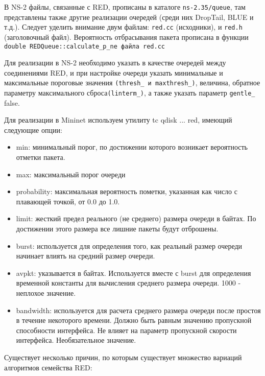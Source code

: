 В NS-2 файлы, связанные с RED, прописаны в каталоге
\verb|ns-2.35/queue|, там представлены также другие реализации
очередей (среди них DropTail, BLUE и т.д.). Следует уделить внимание
двум файлам: \verb|red.cc| (исходники), и \verb|red.h| (заголовочный
файл). Вероятность отбрасывания пакета прописана в функции 
\verb|double REDQueue::calculate_p_ne файла red.cc|

Для реализации в NS-2 необходимо указать в качестве очередей между соединениями
RED, и при настройке очереди указать минимальные и максимальные пороговые значения 
\verb|(thresh_ и maxthresh_)|, величина, обратное параметру максимального сброса\verb|(linterm_)|, 
а также указать параметр \verb|gentle_| false.

Для реализации в Mininet используем утилиту tc qdisk ... red, имеющий следующие опции:
\begin{itemize}
\item min: минимальный порог, по достижении которого возникает вероятность отметки пакета.
\item max: максимальный порог очереди
\item probability: максимальная вероятность пометки, указанная как число с плавающей точкой, от 0.0 до 1.0. 
\item limit: жесткий предел реального (не среднего) размера очереди в байтах. По достижении этого размера все лишние пакеты будут отброшены.
\item burst: используется для определения того, как реальный размер очереди начинает влиять на средний размер очереди. 
\item avpkt: указывается в байтах. Используется вместе с burst для определения временной константы для вычисления среднего размера очереди. 1000 - неплохое значение.
\item bandwidth: используется для расчета среднего размера очереди после простоя в течение некоторого времени. Должно быть равным значению пропускной способности интерфейса. Не влияет на параметр пропускной скорости интерфейса. Необязательное значение.

\end{itemize}

Существует несколько причин, по которым существует множество вариаций алгоритмов семейства RED:

